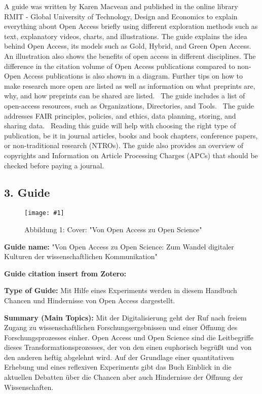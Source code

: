 \documentclass{article}
\newlength{\imgwidth}
\newcommand\scaledgraphics[2]{%
                
\settowidth{\imgwidth}{\texttt{[image: \#1]}}%
                
\setlength{\imgwidth}{\minof{\imgwidth}{#2\textwidth}}%
                
\texttt{[image: \#1]}%
                
}
\begin{document}
A guide was written by Karen Macvean and published in the online library RMIT - Global University of Technology, Design and Economics to explain everything about Open Access briefly using different exploration methods such as text, explanatory videos, charts, and illustrations. The guide explains the idea behind Open Access, its models such as Gold, Hybrid, and Green Open Access. An illustration also shows the benefits of open access in different disciplines. The difference in the citation volume of Open Access publications compared to non-Open Access publications is also shown in a diagram. Further tips on how to make research more open are listed as well as information on what preprints are, why, and how preprints can be shared are listed.  The guide includes a list of open-access resources, such as Organizations, Directories, and Tools.  The guide addresses FAIR principles, policies, and ethics, data planning, storing, and sharing data.  Reading this guide will help with choosing the right type of publication, be it in journal articles, books and book chapters, conference papers, or non-traditional research (NTROs). The guide also provides an overview of copyrights and Information on Article Processing Charges (APCs) that should be checked before paying a journal.


\subsection{3. Guide}\label{H9740541}



\begin{center}
\begin{figure}
\scaledgraphics{499c4719-8346-4a67-8a5b-fcacfb0ecde0.png}{0.5}
\caption*{Abbildung 1: Cover: "Von Open Access zu Open Science"}\label{F14991031}
\end{figure}


\end{center}





\textbf{Guide name:} "Von Open Access zu Open Science: Zum Wandel digitaler Kulturen der wissenschaftlichen Kommunikation"


\textbf{Guide citation insert from Zotero:}  \autocite{heise_von_2018}


\textbf{Type of Guide: }Mit Hilfe eines Experiments werden in diesem Handbuch Chancen und Hindernisse von Open Access dargestellt. 


\textbf{Summary (Main Topics): }Mit der Digitalisierung geht der Ruf nach freiem Zugang zu wissenschaftlichen Forschungsergebnissen und einer Öffnung des Forschungsprozesses einher. Open Access und Open Science sind die Leitbegriffe dieses Transformationsprozesses, der von den einen euphorisch begrüßt und von den anderen heftig abgelehnt wird. Auf der Grundlage einer quantitativen Erhebung und eines reflexiven Experiments gibt das Buch Einblick in die aktuellen Debatten über die Chancen aber auch Hindernisse der Öffnung der Wissenschaften.
\end{document}
